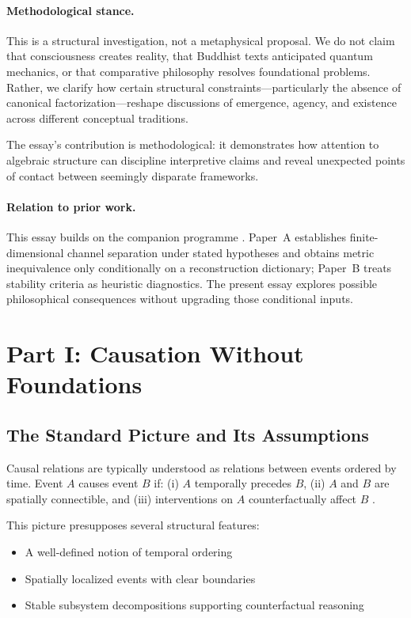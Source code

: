 \documentclass[12pt,a4paper,openany]{book}
\begin{document}
\paragraph{Methodological stance.}
This is a structural investigation, not a metaphysical proposal. We do not claim that consciousness creates reality, that Buddhist texts anticipated quantum mechanics, or that comparative philosophy resolves foundational problems. Rather, we clarify how certain structural constraints—particularly the absence of canonical factorization—reshape discussions of emergence, agency, and existence across different conceptual traditions.

The essay's contribution is methodological: it demonstrates how attention to algebraic structure can discipline interpretive claims and reveal unexpected points of contact between seemingly disparate frameworks.

\paragraph{Relation to prior work.}
This essay builds on the companion programme \cite{Liu2026PaperA,Liu2026PaperB}.  Paper~A establishes finite-dimensional channel separation under stated hypotheses and obtains metric inequivalence only conditionally on a reconstruction dictionary; Paper~B treats stability criteria as heuristic diagnostics.  The present essay explores possible philosophical consequences without upgrading those conditional inputs.

\section{Part I: Causation Without Foundations}
\label{C-sec:causation}

\subsection{The Standard Picture and Its Assumptions}
\label{C-sec:I.1}

Causal relations are typically understood as relations between events ordered by time. Event $A$ causes event $B$ if: (i) $A$ temporally precedes $B$, (ii) $A$ and $B$ are spatially connectible, and (iii) interventions on $A$ counterfactually affect $B$ \cite{Pearl2009}.

This picture presupposes several structural features:
\begin{itemize}
\item A well-defined notion of temporal ordering
\item Spatially localized events with clear boundaries
\item Stable subsystem decompositions supporting counterfactual reasoning
\end{itemize}
\end{document}
